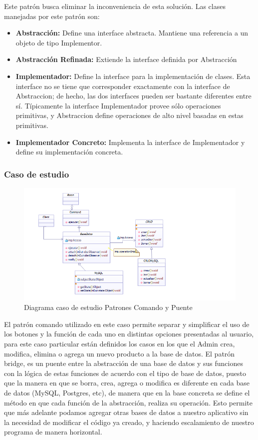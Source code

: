 Este patrón busca eliminar la inconveniencia de esta solución. Las clases manejadas por este patrón son:
\begin{itemize}
	\item \textbf{Abstracción: }Define una interface abstracta. Mantiene una referencia a un objeto de tipo Implementor.
	\item \textbf{Abstracción Refinada: }Extiende la interface definida por Abstracción 
	\item \textbf{Implementador: }Define la interface para la implementación de clases. Esta interface no se tiene que corresponder exactamente con la interface de Abstraccion; de hecho, las dos interfaces pueden ser bastante diferentes entre sí. Típicamente la interface Implementador provee sólo operaciones primitivas, y Abstraccion define operaciones de alto nivel basadas en estas primitivas.
	\item \textbf{Implementador Concreto: }Implementa la interface de Implementador y define su implementación concreta.
\end{itemize}

\subsubsection{Caso de estudio}

\begin{figure}[th!]
\centering
\includegraphics[width=1.0\linewidth]{arquitectura/imagenes/DiagramaComandoYPuente}
\caption{Diagrama caso de estudio Patrones Comando y Puente}
\end{figure}



El patrón comando utilizado en este caso permite separar y simplificar el uso de los botones y la función de cada uno en distintas opciones presentadas al usuario, para este caso particular están definidos los casos en los que el Admin crea, modifica, elimina o agrega un nuevo producto a la base de datos.
El patrón bridge, es un puente entre la abstracción de una base de datos y sus funciones con la lógica de estas funciones de acuerdo con el tipo de base de datos, puesto que la manera en que se borra, crea, agrega o modifica es diferente en cada base de datos (MySQL, Postgres, etc), de manera que en la base concreta se define el método en que cada función de la abstracción, realiza su operación. Esto permite que más adelante podamos agregar otras bases de datos a nuestro aplicativo sin la necesidad de modificar el código ya creado, y haciendo escalamiento de nuestro programa de manera horizontal.

